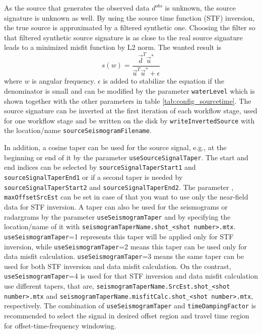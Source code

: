 \documentclass[pdftex,a4paper,parskip,listof=totoc,bibliography=totoc,onehalfspacing,12pt]{scrreprt}
\begin{document}
As the source that generates the observed data $d^{obs}$ is unknown, the source signature is unknown as well. By using the source time function (STF) inversion, the true source is approximated by a filtered synthetic one. Choosing the filter so that filtered synthetic source signature is as close to the real source signature leads to a minimized misfit function by L2 norm. The wanted result is 
\begin{equation*}
 s(w)=\dfrac{\vec{d}^T\vec{u}^*}{\vec{u}^T\vec{u}^*+\epsilon}
\end{equation*}
where $w$ is angular frequency. $\epsilon$ is added to stabilize the equation if the denominator is small and can be modified by the parameter \verb+waterLevel+ which is shown together with the other parameters in table \ref{tab:config_sourcetime}. The source signature can be inverted at the first iteration of each workflow stage, used for one workflow stage and be written on the disk by \verb+writeInvertedSource+ with the location/name \verb+sourceSeismogramFilename+.

In addition, a cosine taper can be used for the source signal, e.g., at the beginning or end of it by the parameter \verb+useSourceSignalTaper+. The start and end indices can be selected by \verb+sourceSignalTaperStart1+ and \verb+sourceSignalTaperEnd1+ or if a second taper is needed by \verb+sourceSignalTaperStart2+ and \verb+sourceSignalTaperEnd2+. The parameter , \verb+maxOffsetSrcEst+ can be set in case of that you want to use only the near-field data for STF inversion.
A taper can also be used for the seismograms or radargrams by the parameter \verb+useSeismogramTaper+ and by specifying the location/name of it with \verb+seismogramTaperName.shot_<shot number>.mtx+. \verb+useSeismogramTaper+=1 represents this taper will be applied only for STF inversion, while \verb+useSeismogramTaper+=2 means this taper can be used only for data misfit calculation. \verb+useSeismogramTaper+=3 means the same taper can be used for both STF inversion and data misfit calculation.  On the contrast, \verb+useSeismogramTaper+=4 is used for that STF inversion and data misfit calculation use different tapers, that are,  \verb+seismogramTaperName.SrcEst.shot_<shot number>.mtx+ and \verb+seismogramTaperName.misfitCalc.shot_<shot number>.mtx+, respectively. The combination of \verb+useSeismogramTaper+ and \verb+timeDampingFactor+ is recommended to select the signal in desired offset region and travel time region for offset-time-frequency windowing.
\end{document}
